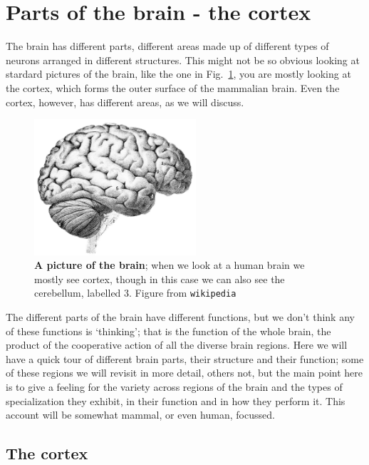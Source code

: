 \documentclass[12pt]{article}
\begin{document}
\section*{Parts of the brain - the cortex}

The brain has different parts, different areas made up of different
types of neurons arranged in different structures. This might not be
so obvious looking at stardard pictures of the brain, like the one in
Fig.~\ref{fig_brain}, you are mostly looking at the cortex, which
forms the outer surface of the mammalian brain. Even the cortex,
however, has different areas, as we will discuss.

\begin{figure}[tbhp]
  \begin{center}
  \includegraphics[width=6cm]{brain.jpg}
\end{center}
  \caption{\textbf{A picture of the brain}; when we look at a human
    brain we mostly see cortex, though in this case we can also see
    the cerebellum, labelled 3. Figure from
    \texttt{wikipedia}\label{fig_brain}}
\end{figure}

The different parts of the brain have different functions, but we
don't think any of these functions is `thinking'; that is the function
of the whole brain, the product of the cooperative action of all the
diverse brain regions. Here we will have a quick tour of different
brain parts, their structure and their function; some of these regions
we will revisit in more detail, others not, but the main point here is
to give a feeling for the variety across regions of the brain and the
types of specialization they exhibit, in their function and in how
they perform it. This account will be somewhat mammal, or even human,
focussed.

\subsection*{The cortex}
\end{document}
